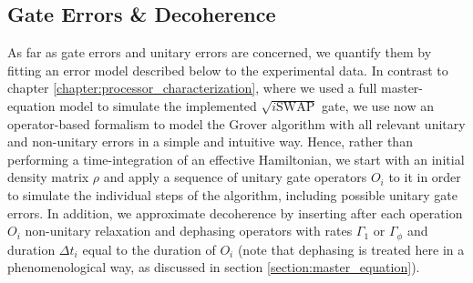 \subsection{Gate Errors \& Decoherence}

As far as gate errors and unitary errors are concerned, we quantify them by fitting an error model described below to the experimental data. In contrast to chapter \ref{chapter:processor_characterization}, where we used a full master-equation model to simulate the implemented $\sqrt{i\mathrm{SWAP}}$ gate, we use now an operator-based formalism to model the Grover algorithm with all relevant unitary and non-unitary errors in a simple and intuitive way. Hence, rather than performing a time-integration of an effective Hamiltonian, we start with an initial density matrix $\rho$ and apply a sequence of unitary gate operators $O_i$ to it in order to simulate the individual steps of the algorithm, including possible unitary gate errors. In addition, we approximate decoherence by inserting after each operation $O_i$ non-unitary relaxation and dephasing operators with rates $\Gamma_1$ or $\Gamma_\phi$ and duration $\Delta t_i$ equal to the duration of $O_i$ (note that dephasing is treated here in a phenomenological way, as discussed in section \ref{section:master_equation}). 

\smallskip

